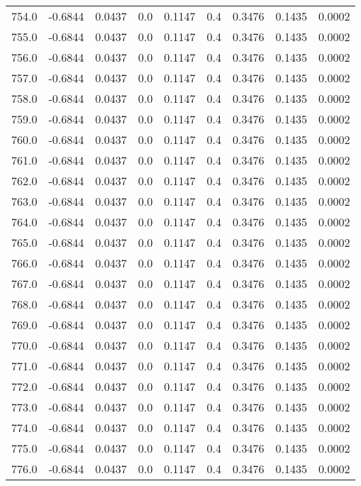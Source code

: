 \begin{longtable}{lrrrrrrrr}
754.0 & -0.6844 & 0.0437 & 0.0 & 0.1147 & 0.4 & 0.3476 & 0.1435 & 0.0002 \\
755.0 & -0.6844 & 0.0437 & 0.0 & 0.1147 & 0.4 & 0.3476 & 0.1435 & 0.0002 \\
756.0 & -0.6844 & 0.0437 & 0.0 & 0.1147 & 0.4 & 0.3476 & 0.1435 & 0.0002 \\
757.0 & -0.6844 & 0.0437 & 0.0 & 0.1147 & 0.4 & 0.3476 & 0.1435 & 0.0002 \\
758.0 & -0.6844 & 0.0437 & 0.0 & 0.1147 & 0.4 & 0.3476 & 0.1435 & 0.0002 \\
759.0 & -0.6844 & 0.0437 & 0.0 & 0.1147 & 0.4 & 0.3476 & 0.1435 & 0.0002 \\
760.0 & -0.6844 & 0.0437 & 0.0 & 0.1147 & 0.4 & 0.3476 & 0.1435 & 0.0002 \\
761.0 & -0.6844 & 0.0437 & 0.0 & 0.1147 & 0.4 & 0.3476 & 0.1435 & 0.0002 \\
762.0 & -0.6844 & 0.0437 & 0.0 & 0.1147 & 0.4 & 0.3476 & 0.1435 & 0.0002 \\
763.0 & -0.6844 & 0.0437 & 0.0 & 0.1147 & 0.4 & 0.3476 & 0.1435 & 0.0002 \\
764.0 & -0.6844 & 0.0437 & 0.0 & 0.1147 & 0.4 & 0.3476 & 0.1435 & 0.0002 \\
765.0 & -0.6844 & 0.0437 & 0.0 & 0.1147 & 0.4 & 0.3476 & 0.1435 & 0.0002 \\
766.0 & -0.6844 & 0.0437 & 0.0 & 0.1147 & 0.4 & 0.3476 & 0.1435 & 0.0002 \\
767.0 & -0.6844 & 0.0437 & 0.0 & 0.1147 & 0.4 & 0.3476 & 0.1435 & 0.0002 \\
768.0 & -0.6844 & 0.0437 & 0.0 & 0.1147 & 0.4 & 0.3476 & 0.1435 & 0.0002 \\
769.0 & -0.6844 & 0.0437 & 0.0 & 0.1147 & 0.4 & 0.3476 & 0.1435 & 0.0002 \\
770.0 & -0.6844 & 0.0437 & 0.0 & 0.1147 & 0.4 & 0.3476 & 0.1435 & 0.0002 \\
771.0 & -0.6844 & 0.0437 & 0.0 & 0.1147 & 0.4 & 0.3476 & 0.1435 & 0.0002 \\
772.0 & -0.6844 & 0.0437 & 0.0 & 0.1147 & 0.4 & 0.3476 & 0.1435 & 0.0002 \\
773.0 & -0.6844 & 0.0437 & 0.0 & 0.1147 & 0.4 & 0.3476 & 0.1435 & 0.0002 \\
774.0 & -0.6844 & 0.0437 & 0.0 & 0.1147 & 0.4 & 0.3476 & 0.1435 & 0.0002 \\
775.0 & -0.6844 & 0.0437 & 0.0 & 0.1147 & 0.4 & 0.3476 & 0.1435 & 0.0002 \\
776.0 & -0.6844 & 0.0437 & 0.0 & 0.1147 & 0.4 & 0.3476 & 0.1435 & 0.0002 \\

\end{longtable}
